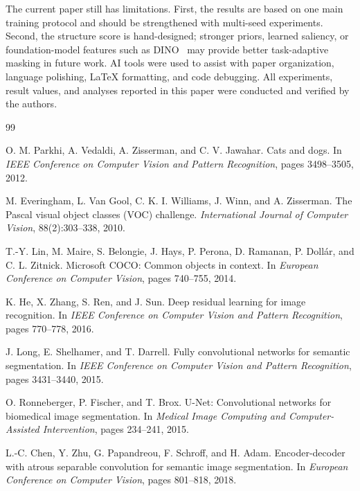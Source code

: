 \documentclass[11pt]{article}
\begin{document}
The current paper still has limitations. First, the results are based on one main training protocol and should be strengthened with multi-seed experiments. Second, the structure score is hand-designed; stronger priors, learned saliency, or foundation-model features such as DINO~\cite{caron2021emerging} may provide better task-adaptive masking in future work. AI tools were used to assist with paper organization, language polishing, LaTeX formatting, and code debugging. All experiments, result values, and analyses reported in this paper were conducted and verified by the authors.

\begin{thebibliography}{99}

O. M. Parkhi, A. Vedaldi, A. Zisserman, and C. V. Jawahar.
\newblock Cats and dogs.
\newblock In \emph{IEEE Conference on Computer Vision and Pattern Recognition}, pages 3498--3505, 2012.

M. Everingham, L. Van Gool, C. K. I. Williams, J. Winn, and A. Zisserman.
\newblock The Pascal visual object classes (VOC) challenge.
\newblock \emph{International Journal of Computer Vision}, 88(2):303--338, 2010.

T.-Y. Lin, M. Maire, S. Belongie, J. Hays, P. Perona, D. Ramanan, P. Doll{\'a}r, and C. L. Zitnick.
\newblock Microsoft COCO: Common objects in context.
\newblock In \emph{European Conference on Computer Vision}, pages 740--755, 2014.


K. He, X. Zhang, S. Ren, and J. Sun.
\newblock Deep residual learning for image recognition.
\newblock In \emph{IEEE Conference on Computer Vision and Pattern Recognition}, pages 770--778, 2016.

J. Long, E. Shelhamer, and T. Darrell.
\newblock Fully convolutional networks for semantic segmentation.
\newblock In \emph{IEEE Conference on Computer Vision and Pattern Recognition}, pages 3431--3440, 2015.

O. Ronneberger, P. Fischer, and T. Brox.
\newblock U-Net: Convolutional networks for biomedical image segmentation.
\newblock In \emph{Medical Image Computing and Computer-Assisted Intervention}, pages 234--241, 2015.

L.-C. Chen, Y. Zhu, G. Papandreou, F. Schroff, and H. Adam.
\newblock Encoder-decoder with atrous separable convolution for semantic image segmentation.
\newblock In \emph{European Conference on Computer Vision}, pages 801--818, 2018.


\end{thebibliography}
\end{document}
